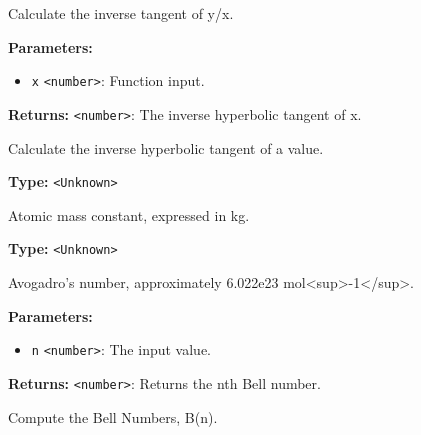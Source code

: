 \documentclass[12pt,a4paper]{article}
\begin{document}
\noindent Calculate the inverse tangent of \textasciigrave{}y/x\textasciigrave{}.

\vspace{5mm}
\noindent {}


\noindent \textbf{Parameters:}
\begin{itemize}
  \item \texttt{x} \texttt{<number>}: Function input.
\end{itemize}

\noindent \textbf{Returns:} \texttt{<number>}: The inverse hyperbolic tangent of \textasciigrave{}x\textasciigrave{}.

\noindent Calculate the inverse hyperbolic tangent of a value.

\vspace{5mm}
\noindent {}\vspace{4mm}


\noindent \textbf{Type:} \texttt{<Unknown>}

\noindent Atomic mass constant, expressed in kg.

\vspace{5mm}
\noindent {}\vspace{4mm}


\noindent \textbf{Type:} \texttt{<Unknown>}

\noindent Avogadro's number, approximately \textasciigrave{}6.022e23\textasciigrave{} mol<sup>-1</sup>.

\vspace{5mm}
\noindent {}


\noindent \textbf{Parameters:}
\begin{itemize}
  \item \texttt{n} \texttt{<number>}: The input value.
\end{itemize}

\noindent \textbf{Returns:} \texttt{<number>}: Returns the nth Bell number.

\noindent Compute the Bell Numbers, \textasciigrave{}B(n)\textasciigrave{}.
\end{document}
